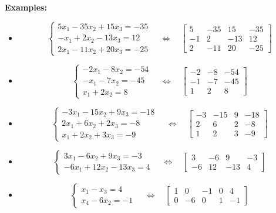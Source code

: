 \documentclass{article}
\begin{document}
\textbf{Examples:}
\begin{itemize}
\item 
\[\left\{\begin{array}{c}
5x_1 - 35x_2 + 15x_3 = -35 \\
-x_1 + 2x_2 - 13x_3 = 12 \\
2x_1 - 11x_2 + 20x_3 = -25
\end{array}\right. 
\quad\iff\quad 
\left[\begin{array}{ccc|c}
5 & -35 & 15 & -35 \\
-1 & 2 & -13 & 12 \\
2 & -11 & 20 & -25
\end{array}\right]\]
\item 
\[\left\{\begin{array}{c}
-2x_1 - 8x_2 = -54 \\
-x_1 - 7x_2 = -45 \\
x_1 + 2x_2 = 8
\end{array}\right. 
\quad\iff\quad 
\left[\begin{array}{cc|c}
-2 & -8 & -54 \\
-1 & -7 & -45 \\
1 & 2 & 8 
\end{array}\right]\]
\item 
\[\left\{\begin{array}{c}
-3x_1 - 15x_2 + 9x_3 = -18 \\
2x_1 + 6x_2 + 2x_3 = -8 \\
x_1 + 2x_2 + 3x_3 = -9
\end{array}\right. 
\quad\iff\quad 
\left[\begin{array}{ccc|c}
-3 & -15 & 9 & -18\\
2 & 6 & 2 & -8 \\
1 & 2 & 3 & -9 
\end{array}\right]\]
\item 
\[\left\{\begin{array}{c}
3x_1 - 6x_2 + 9x_3 = -3 \\
-6x_1 + 12x_2 - 13x_3 = 4 
\end{array}\right. 
\quad\iff\quad 
\left[\begin{array}{ccc|c}
3 & -6 & 9 & -3 \\ 
-6 & 12 & -13 & 4 
\end{array}\right]\]
\item 
\[\left\{\begin{array}{c}
x_1 - x_3 = 4 \\
x_4 - 6x_2 = -1  
\end{array}\right. 
\quad\iff\quad 
\left[\begin{array}{cccc|c}
1 & 0 & -1 & 0 & 4 \\ 
0 & -6 & 0 & 1 & -1 
\end{array}\right]\]
\end{itemize}
\end{document}
